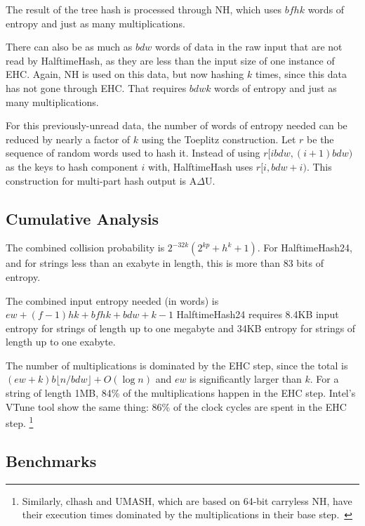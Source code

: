 \documentclass[runningheads]{llncs}
\newcommand{\ints}{\mathbb{Z}}
\begin{document}
The result of the tree hash is processed through NH, which uses $b f h k$ words of entropy and just as many multiplications.

There can also be as much as $b d w$ words of data in the raw input that are not read by HalftimeHash, as they are less than the input size of one instance of EHC.
Again, NH is used on this data, but now hashing $k$ times, since this data has not gone through EHC.
That requires $b d w k$ words of entropy and just as many multiplications.

For this previously-unread data, the number of words of entropy needed can be reduced by nearly a factor of $k$ using the Toeplitz construction.
Let $r$ be the sequence of random words used to hash it.
Instead of using $r[i b d w, (i+1)b d w)$ as the keys to hash component $i$ with, HalftimeHash uses $r[i, b d w + i)$.
This construction for multi-part hash output is A$\Delta$U. \cite{ehc-nandi,woelfel-toeplitz}

\subsection{Cumulative Analysis}

The combined collision probability is
$2^{-32k}\left(2^{kp} + h^k + 1\right)$.
For HalftimeHash24, and for strings less than an exabyte in length, this is more than 83 bits of entropy.

The combined input entropy needed (in words) is
$
e w
+ (f-1) h k
+ b f h k
+ b d w + k - 1
$
HalftimeHash24 requires 8.4KB input entropy for strings of length up to one megabyte and 34KB entropy for strings of length up to one exabyte.

The number of multiplications is dominated by the EHC step, since the total is $(e w + k) b \lfloor n / b d w \rfloor + O(\log n)$ and $e w$ is significantly larger than $k$.
For a string of length 1MB, 84\% of the multiplications happen in the EHC step. %
Intel's VTune tool show the same thing: 86\% of the clock cycles are spent in the EHC step.
\footnote{Similarly, clhash and UMASH, which are based on 64-bit carryless NH, have their execution times dominated by the multiplications in their base step.~\cite{umash,clhash}}

\subsection{Benchmarks}
\label{benchmarks}
\end{document}
